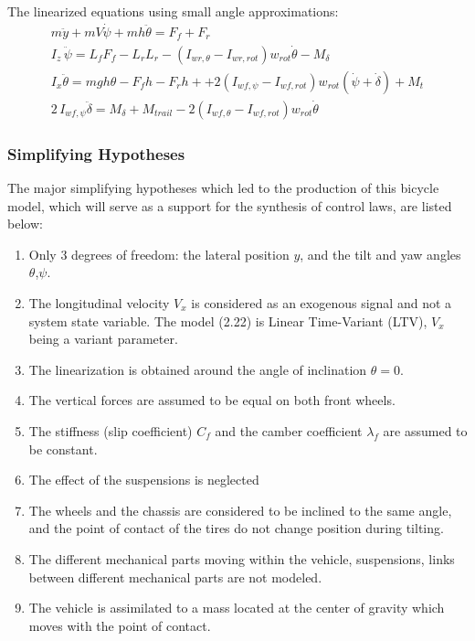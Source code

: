 The linearized equations using small angle approximations:
\begin{eqnarray}
m\ddot{y}+mV \dot{\psi}+mh\ddot{\theta}=F_{f}+F_{r} \\
I_{z}\,\ddot{\psi}=L_{f}F_{f}-L_{r}L_{r}-(I_{wr,\theta}-I_{wr,rot})w_{rot}\dot{\theta}-M_{\delta}\\
I_{x} \ddot{\theta}=mgh\theta -F_{f}h-F_{r}h + +2(I_{wf,\psi}-I_{wf,rot})w_{rot}(\dot{\psi}+\dot{\delta}) +M_{t}\\
2\,I_{wf,\psi}\ddot{\delta}=M_{\delta}+M_{trail}-2(I_{wf,\theta}-I_{wf,rot})w_{rot}\dot{\theta}
\end{eqnarray}
\newpage
\subsubsection{\textbf{Simplifying Hypotheses}}

The major simplifying hypotheses which led to the production of this bicycle model, which will serve as a support for the synthesis of control laws, are listed below: 
\begin{enumerate}\itemsep -7pt
\item Only 3 degrees of freedom: the lateral position $y$, and the tilt and yaw angles $\theta$,$\psi$. %
\item The longitudinal velocity $V_{x}$ is considered as an exogenous signal and not a system state variable. The model (2.22) is Linear Time-Variant (LTV), $V_{x}$ being a variant parameter.
\item The linearization is obtained around the angle of inclination $\theta=0$.
\item The vertical forces are assumed to be equal on both front wheels. 
\item The stiffness (slip coefficient) $C_{f}$ and the camber coefficient $\lambda_{f}$ are assumed to be constant.
\item The effect of the suspensions is neglected 
\item The wheels and the chassis are considered to be inclined to the same angle, and the point of contact of the tires do not change position during tilting.
\item The different mechanical parts moving within the vehicle, suspensions, links between different mechanical parts are not modeled.
\item The vehicle is assimilated to a mass located at the center of gravity which moves with the point of contact.
\end{enumerate}

